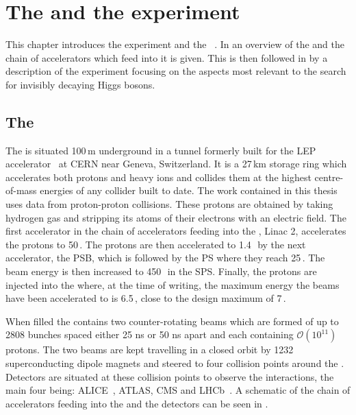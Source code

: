 \chapter{The \LHC and the \CMS experiment}
\label{chap:detector}
This chapter introduces the \CMS experiment and the \LHC~\cite{1748-0221-3-08-S08001}. In  an overview of the \LHC and the chain of accelerators which feed into it is given. This is then followed in  by a description of the \CMS experiment focusing on the aspects most relevant to the search for invisibly decaying Higgs bosons.

\section{The \LHC}
\label{sec:lhc}
The \LHC is situated 100\,m underground in a tunnel formerly built for the LEP accelerator~\cite{lepdesign} at CERN near Geneva, Switzerland. It is a 27\,km storage ring which accelerates both protons and heavy ions and collides them at the highest centre-of-mass energies of any collider built to date. The work contained in this thesis uses data from proton-proton collisions. These protons are obtained by taking hydrogen gas and stripping its atoms of their electrons with an electric field. The first accelerator in the chain of accelerators feeding into the \LHC, Linac 2, accelerates the protons to 50\,\MeV. The protons are then accelerated to 1.4\,\GeV~by the next accelerator, the \ac{PSB}, which is followed by the \ac{PS} where they reach 25\,\GeV. The beam energy is then increased to 450\,\GeV~in the \ac{SPS}. Finally, the protons are injected into the \LHC where, at the time of writing, the maximum energy the beams have been accelerated to is 6.5\,\TeV, close to the design maximum of 7\,\TeV.

When filled the \LHC contains two counter-rotating beams which are formed of up to 2808 bunches spaced either 25 ns or 50 ns apart and each containing $\mathcal{O}(10^{11})$ protons. The two beams are kept travelling in a closed orbit by 1232 superconducting dipole magnets and steered to four collision points around the \LHC. Detectors are situated at these collision points to observe the interactions, the main four being: ALICE~\cite{Aamodt:2008zz}, ATLAS, CMS and LHCb~\cite{Alves:2008zz}. A schematic of the chain of accelerators feeding into the \LHC and the \LHC detectors can be seen in .

